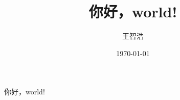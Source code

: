 \documentclass[UTF8]{ctexart}
\title{你好，world!}
\author{王智浩}
\date{\today}
\begin{document}
\newpage
\maketitle
你好，world!
\end{document}
